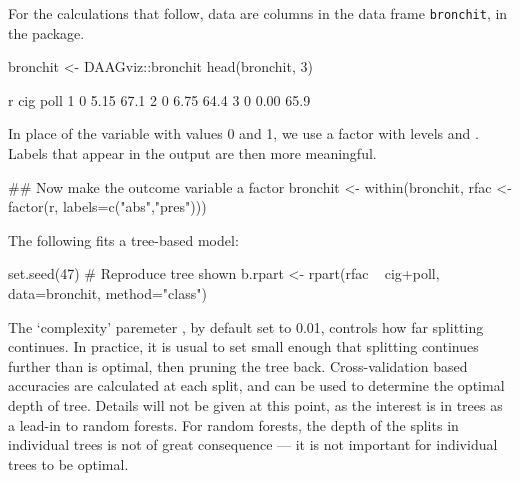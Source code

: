 For the calculations that follow, data are columns in the data frame
\texttt{bronchit}, in the  package.
\begin{Schunk}
\begin{Sinput}
bronchit <- DAAGviz::bronchit
head(bronchit, 3)
\end{Sinput}
\begin{Soutput}
  r  cig poll
1 0 5.15 67.1
2 0 6.75 64.4
3 0 0.00 65.9
\end{Soutput}
\end{Schunk}
In place of the variable  with values 0 and 1, we use a
factor with levels  and . Labels that appear
in the output are then more meaningful.
\begin{Schunk}
\begin{Sinput}
## Now make the outcome variable a factor
bronchit <-
  within(bronchit,
         rfac <- factor(r, labels=c("abs","pres")))
\end{Sinput}
\end{Schunk}

The following fits a tree-based model:
\begin{Schunk}
\begin{Sinput}
set.seed(47)   # Reproduce tree shown
b.rpart <- rpart(rfac ~ cig+poll, data=bronchit,
                 method="class")
\end{Sinput}
\end{Schunk}

The `complexity' paremeter , by default set to 0.01,
controls how far splitting continues.  In practice, it is usual to
set  small enough that splitting continues further than
is optimal, then pruning the tree back. Cross-validation based
accuracies are calculated at each split, and can be used to determine
the optimal depth of tree.  Details will not be given at this point,
as the interest is in trees as a lead-in to random forests.  For
random forests, the depth of the splits in individual trees is not
of great consequence --- it is not important for individual trees
to be optimal.

